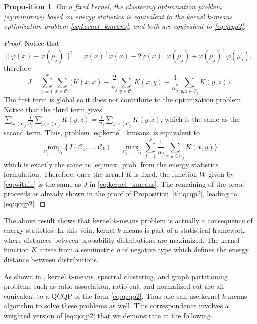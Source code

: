 \documentclass[aps,preprint,nofootinbib,floatfix]{revtex4-1}
\newtheorem{proposition}[theorem]{Proposition}
\newcommand\kk{K}
\newcommand\C{{\mathcal{C}}}
\begin{document}
\begin{proposition}
\label{th:kernel_kmeans}
For a fixed kernel,
the clustering optimization problem
\eqref{eq:minimize} based on energy statistics 
is equivalent to the kernel $k$-means optimization problem
\eqref{eq:kernel_kmeans}, and both are equivalent to \eqref{eq:qcqp2}.
\end{proposition}
\begin{proof}
Notice that $\| \varphi(x) - \varphi(\mu_j) \|^2 = \varphi(x)^\top \varphi(x)
- 2 \varphi(x)^\top \varphi(\mu_j) + \varphi(\mu_j)^\top \varphi(\mu_j)$,
therefore
\begin{equation}
\label{eq:J}
J = \sum_{j=1}^k \sum_{x\in\C_j} \bigg(
\kk(x,x) - 
\dfrac{2}{n_j} \sum_{y\in \C_j} \kk(x,y) + \dfrac{1}{n_j^2}
\sum_{y,z \in \C_j} \kk(y,z) \bigg).
\end{equation}
The first term is global so it does not contribute to the optimization
problem. Notice that the third term gives
$\sum_{x\in\C_j} \tfrac{1}{n_j^2} \sum_{y,z\in\C_j} \kk(y,z) =
\tfrac{1}{n_j}\sum_{y,z\in\C_j} \kk(y,z)$, which is the same as
the second term. Thus, problem
\eqref{eq:kernel_kmeans} is equivalent to
\begin{equation}
\min_{\C_1,\dotsc,\C_k} \bigg\{ J(\C_1,\dotsc,\C_k) = \max_{\C_1,\dotsc,\C_k}
\sum_{j=1}^k \dfrac{1}{n_j} \sum_{x,y \in\C_j} \kk(x,y) \bigg\}
\end{equation}
which is exactly the same as 
\eqref{eq:max_prob} from the energy statistics formulation. Therefore,
once the kernel $\kk$ is fixed, the function 
$W$ given by \eqref{eq:within} is the same
as $J$ in \eqref{eq:kernel_kmeans}.
The remaining of the proof proceeds as 
already shown in the proof of Proposition~\ref{th:qcqp2}, leading to
\eqref{eq:qcqp2}.
\end{proof}

The above result shows that 
kernel $k$-means problem is actually a consequence
of energy statistics. In this vein, kernel $k$-means is part of a
statistical framework where distances between probability
distributions are maximized. 
The kernel function $\kk$ arises from a semimetric $\rho$ of
negative type which defines the energy distance between distributions.

As shown in \cite{Dhillon2,Dhillon}, kernel $k$-means, spectral clustering,
and graph partitioning problems such as ratio association, ratio cut, and
normalized cut are all equivalent to a QCQP of the form \eqref{eq:qcqp2}. Thus
one can use kernel $k$-means algorithm to solve these problems as well.
This correspondence involves a weighted version of \eqref{eq:qcqp2} that
we demonstrate in the following.
\end{document}
